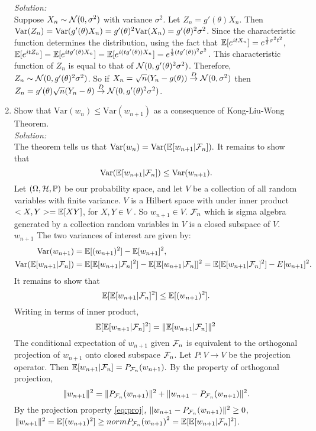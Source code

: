\begin{enumerate}
	\textit{Solution:} \\
	Suppose $X_n \sim \mathcal{N}(0,\sigma^2)$ with variance $\sigma^2$. Let $Z_n = g'(\theta)X_n$. Then $\text{Var}(Z_n) = \text{Var}(g'(\theta)X_n) = g'(\theta)^2\text{Var}(X_n) = g'(\theta)^2\sigma^2$. Since the characteristic function determines the distribution, using the fact that $\mathbb{E}[e^{itX_n}] = e^{\frac{1}{2}\sigma^2t^2}$, $\mathbb{E}[e^{itZ_n}] = \mathbb{E}[e^{itg'(\theta)X_n}] = \mathbb{E}[e^{i(tg'(\theta))X_n}] = e^{\frac{1}{2}(tg'(\theta))^2\sigma^2} $. This characteristic function of $Z_n$ is equal to that of $\mathcal{N}(0,g'(\theta)^2\sigma^2)$. Therefore, $Z_n \sim \mathcal{N}(0,g'(\theta)^2\sigma^2)$. So if $X_n = \sqrt{n}(Y_n -g(\theta)) \overset{D}{\to} \mathcal{N}(0,\sigma^2)$ then $Z_n  =  g'(\theta)\sqrt{n}(Y_n - \theta) \overset{D}{\to} \mathcal{N}(0,g'(\theta)^2\sigma^2)$. 
	\item  Show that $\text{Var}(w_{n}) \leq \text{Var}(w_{n+1})$ as a consequence of Kong-Liu-Wong Theorem.\\
	\textit{Solution:} \\
	The theorem tells us that $\text{Var}(w_n) = \text{Var}(\mathbb{E}[w_{n+1}|\mathcal{F}_n]).$ It remains to show that $$\text{Var}(\mathbb{E}[w_{n+1}|\mathcal{F}_n]) \leq \text{Var}(w_{n+1}).$$
	Let $(\Omega,\mathcal{H},\mathbb{P})$ be our probability space, and let $V$ be a collection of all random variables with finite variance. $V$ is a Hilbert space with under inner product $<X,Y> = \mathbb{E}[XY]$, for $X, Y \in V$ \cite{zimmerman}. So $w_{n+1} \in V$. $\mathcal{F}_n$ which is sigma algebra generated by a collection random variables in $V$ is a closed subspace of $V$.  $w_{n+1}$ The two variances of interest are given by:
	\begin{align}
	\text{Var}(w_{n+1}) &= \mathbb{E}[(w_{n+1})^2] - \mathbb{E}[w_{n+1}]^2, \\
	\text{Var}(\mathbb{E}[w_{n+1}|\mathcal{F}_n]) &= \mathbb{E}[\mathbb{E}[w_{n+1}|\mathcal{F}_n]^2] - \mathbb{E}[\mathbb{E}[w_{n+1}|\mathcal{F}_n]]^2 = \mathbb{E}[\mathbb{E}[w_{n+1}|\mathcal{F}_n]^2] - E[w_{n+1}]^2.
	\end{align}
	It remains to show that
	\begin{equation}
	\mathbb{E}[\mathbb{E}[w_{n+1}|\mathcal{F}_n]^2] \leq \mathbb{E}[(w_{n+1})^2].
	\end{equation} 
	Writing in terms of inner product,
	\begin{equation}
	\mathbb{E}[\mathbb{E}[w_{n+1}|\mathcal{F}_n]^2] = \lVert\mathbb{E}[w_{n+1}|\mathcal{F}_n]\rVert^2
	\end{equation}
	The conditional expectation of $w_{n+1}$ given $\mathcal{F}_n$ is equivalent to the orthogonal projection of $w_{n+1}$ onto closed subspace $\mathcal{F}_n$. Let $P:V \to V$ be the projection operator. Then $\mathbb{E}[w_{n+1}|\mathcal{F}_n] = P_{\mathcal{F}_n}(w_{n+1}).$ By the property of orthogonal projection,
	\begin{equation}\label{eq:proj}
		\lVert w_{n+1}\rVert^2 = \lVert P_{\mathcal{F}_n}(w_{n+1})\rVert^2 + \lVert w_{n+1} - P_{\mathcal{F}_n}(w_{n+1})\rVert^2.
	\end{equation}
	By the projection property \eqref{eq:proj}, $\lVert w_{n+1} - P_{\mathcal{F}_n}(w_{n+1})\rVert^2 \geq 0$, $\lVert w_{n+1}\rVert^2 = \mathbb{E}[(w_{n+1})^2] \geq norm{P_{\mathcal{F}_n}(w_{n+1})}^2 = \mathbb{E}[\mathbb{E}[w_{n+1}|\mathcal{F}_n]^2]$. 
\end{enumerate}
